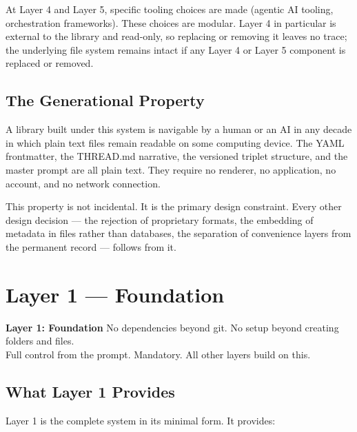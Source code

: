\documentclass[12pt,letterpaper]{article}
\begin{document}
At Layer 4 and Layer 5, specific tooling choices are made
(agentic AI tooling, orchestration frameworks). These choices are
modular. Layer 4 in particular is external to the library and
read-only, so replacing or removing it leaves no trace; the underlying
file system remains intact if any Layer 4 or Layer 5 component is
replaced or removed.

\subsection{The Generational Property}

A library built under this system is navigable by a human or an AI in
any decade in which plain text files remain readable on some computing
device. The YAML frontmatter, the THREAD.md narrative, the versioned
triplet structure, and the master prompt are all plain text. They require
no renderer, no application, no account, and no network connection.

This property is not incidental. It is the primary design constraint.
Every other design decision --- the rejection of proprietary formats,
the embedding of metadata in files rather than databases, the separation
of convenience layers from the permanent record --- follows from it.

\section{Layer 1 --- Foundation}

\begin{layerbox1}
\textbf{Layer 1: Foundation} \quad No dependencies beyond git. No setup beyond creating folders and files.\\
Full control from the prompt. Mandatory. All other layers build on this.
\end{layerbox1}

\subsection{What Layer 1 Provides}

Layer 1 is the complete system in its minimal form. It provides:
\end{document}
